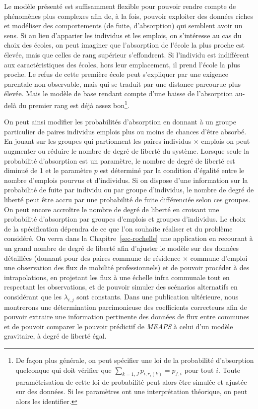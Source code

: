 \documentclass[
  10pt,
  a4paper,
  numbers=noendperiod,
  DIV=9]{scrreprt}
\begin{document}
Le modèle présenté est suffisamment flexible pour pouvoir rendre compte
de phénomènes plus complexes afin de, à la fois, pouvoir exploiter des
données riches et modéliser des comportements (de fuite, d'absorption)
qui semblent avoir un sens. Si au lieu d'apparier les individus et les
emplois, on s'intéresse au cas du choix des écoles, on peut imaginer que
l'absorption de l'école la plus proche est élevée, mais que celles de
rang supérieur s'effondrent. Si l'individu est indifférent aux
caractéristiques des écoles, hors leur emplacement, il prend l'école la
plus proche. Le refus de cette première école peut s'expliquer par une
exigence parentale non observable, mais qui se traduit par une distance
parcourue plus élevée. Mais le modèle de base rendant compte d'une
baisse de l'absorption au-delà du premier rang est déjà assez
bon\footnote{De façon plus générale, on peut spécifier une loi de la
  probabilité d'absorption quelconque qui doit vérifier que
  \(\sum_{k=1,J} p_{i,r_i(k)} = p_{f,i}\) pour tout \(i\). Toute
  paramétrisation de cette loi de probabilité peut alors être simulée et
  ajustée sur des données. Si les paramètres ont une interprétation
  théorique, on peut alors les identifier.}.

On peut ainsi modifier les probabilités d'absorption en donnant à un
groupe particulier de paires individus emplois plus ou moins de chances
d'être absorbé. En jouant sur les groupes qui partionnent les paires
individus \(\times\) emplois on peut augmenter ou réduire le nombre de
degré de liberté du système. Lorsque seule la probabilité d'absorption
est un paramètre, le nombre de degré de liberté est diminué de 1 et le
paramètre \(p\) est déterminé par la condition d'égalité entre le nombre
d'emplois pourvus et d'individus. Si on dispose d'une information sur la
probabilité de fuite par individu ou par groupe d'individus, le nombre
de degré de liberté peut être accru par une probabilité de fuite
différenciée selon ces groupes. On peut encore accroître le nombre de
degré de liberté en croisant une probabilité d'absorption par groupes
d'emplois et groupes d'individus. Le choix de la spécification dépendra
de ce que l'on souhaite réaliser et du problème considéré. On verra dans
la Chapitre~\ref{sec-rochelle} une application en recourant à un grand
nombre de degré de liberté afin d'ajuster le modèle sur des données
détaillées (donnant pour des paires commune de résidence \(\times\)
commune d'emploi une observation des flux de mobilité professionnels) et
de pouvoir procéder à des intrapolations, en projetant les flux à une
échelle infra communale tout en respectant les observations, et de
pouvoir simuler des scénarios alternatifs en considérant que les
\(\lambda_{i,j}\) sont constants. Dans une publication ultérieure, nous
montrerons une détermination parcimonieuse des coefficients correcteurs
afin de pouvoir extraire une information pertinente des données de flux
entre communes et de pouvoir comparer le pouvoir prédictif de
\emph{MEAPS} à celui d'un modèle gravitaire, à degré de liberté égal.
\end{document}
